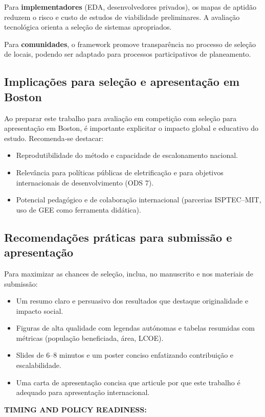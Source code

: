 \documentclass[12pt, a4paper]{article}
\begin{document}
Para \textbf{implementadores} (EDA, desenvolvedores privados), os mapas de aptidão reduzem o risco e custo de estudos de viabilidade preliminares. A avaliação tecnológica orienta a seleção de sistemas apropriados.

Para \textbf{comunidades}, o framework promove transparência no processo de seleção de locais, podendo ser adaptado para processos participativos de planeamento.

\subsection{Implicações para seleção e apresentação em Boston}
Ao preparar este trabalho para avaliação em competição com seleção para apresentação em Boston, é importante explicitar o impacto global e educativo do estudo. Recomenda‑se destacar:
\begin{itemize}
    \item Reprodutibilidade do método e capacidade de escalonamento nacional.
    \item Relevância para políticas públicas de eletrificação e para objetivos internacionais de desenvolvimento (ODS 7).
    \item Potencial pedagógico e de colaboração internacional (parcerias ISPTEC–MIT, uso de GEE como ferramenta didática).
\end{itemize}

\subsection{Recomendações práticas para submissão e apresentação}
Para maximizar as chances de seleção, inclua, no manuscrito e nos materiais de submissão:
\begin{itemize}
    \item Um resumo claro e persuasivo dos resultados que destaque originalidade e impacto social.
    \item Figuras de alta qualidade com legendas autónomas e tabelas resumidas com métricas (população beneficiada, área, LCOE).
    \item Slides de 6–8 minutos e um poster conciso enfatizando contribuição e escalabilidade.
    \item Uma carta de apresentação concisa que articule por que este trabalho é adequado para apresentação internacional.
\end{itemize}

\noindent\textbf{TIMING AND POLICY READINESS:}
\end{document}
